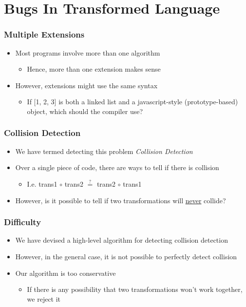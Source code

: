 \documentclass[bigger]{beamer}
\begin{document}
\section{Bugs In Transformed Language}
\label{sec-3}
\begin{frame}
\frametitle{Multiple Extensions}
\label{sec-3-1}


\begin{itemize}
\item Most programs involve more than one algorithm
\begin{itemize}
\item Hence, more than one extension makes sense
\end{itemize}
\item However, extensions might use the same syntax
\begin{itemize}
\item If [1, 2, 3] is both a linked list and a javascript-style (prototype-based) object, which should the compiler use?
\end{itemize}
\end{itemize}
\end{frame}
\begin{frame}
\frametitle{Collision Detection}
\label{sec-3-2}



\begin{itemize}
\item We have termed detecting this problem \emph{Collision Detection}
\item Over a single piece of code, there are ways to tell if there is collision
\begin{itemize}
\item I.e. trans1 \(\circ\) trans2 \(\overset{?}{=}\) trans2 \(\circ\) trans1
\end{itemize}
\item However, is it possible to tell if two transformations will \underline{never} collide?
\end{itemize}
\end{frame}
\begin{frame}
\frametitle{Difficulty}
\label{sec-3-3}



\begin{itemize}
\item We have devised a high-level algorithm for detecting collision detection
\item However, in the general case, it is not possible to perfectly detect collision
\item Our algorithm is too conservative
\begin{itemize}
\item If there is any possibility that two transformations won't work together, we reject it
\end{itemize}
\end{itemize}
\end{frame}
\end{document}
